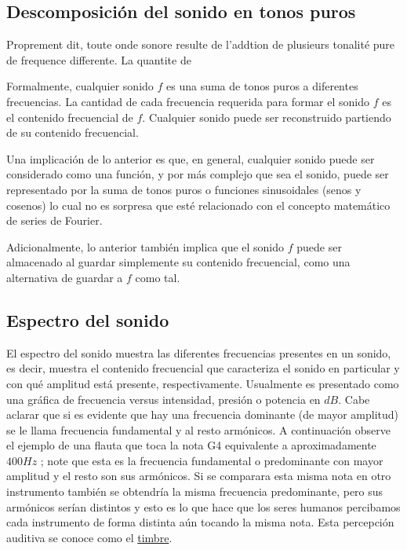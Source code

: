 \documentclass[conference,onecolumn]{IEEEtran}
\begin{document}
\subsection{Descomposición del sonido en tonos puros}
Proprement dit, toute onde sonore resulte de l’addtion de plusieurs tonalité pure de frequence differente. La quantite de 

Formalmente, cualquier sonido $f$ es una suma de tonos puros a diferentes frecuencias. La cantidad de cada frecuencia requerida para formar el sonido $f$ es el contenido frecuencial de $f$. Cualquier sonido puede ser reconstruido partiendo de su contenido frecuencial.

Una implicación de lo anterior es que, en general, cualquier sonido puede ser considerado como una función, y por más complejo que sea el sonido, puede ser representado por la suma de tonos puros o funciones sinusoidales (senos y cosenos) lo cual no es sorpresa que esté relacionado con el concepto matemático de series de Fourier. 

Adicionalmente, lo anterior también implica que el sonido $f$ puede ser almacenado al guardar simplemente su contenido frecuencial, como una alternativa de guardar a $f$ como tal.

\subsection{Espectro del sonido}
El espectro del sonido muestra las diferentes frecuencias presentes en un sonido, es decir, muestra el contenido frecuencial que caracteriza el sonido en particular y con qué amplitud está presente, respectivamente. Usualmente es presentado como una gráfica de frecuencia versus intensidad, presión o potencia en $dB$. Cabe aclarar que si es evidente que hay una frecuencia dominante (de mayor amplitud) se le llama frecuencia fundamental y al resto armónicos. A continuación observe el ejemplo de una flauta que toca la nota G4 equivalente a aproximadamente $400 Hz$ ; note que esta es la frecuencia fundamental o predominante con mayor amplitud y el resto son sus armónicos. Si se comparara esta misma nota en otro instrumento también se obtendría la misma frecuencia predominante, pero sus armónicos serían distintos y esto es lo que hace que los seres humanos percibamos cada instrumento de forma distinta aún tocando la misma nota. Esta percepción auditiva se conoce como el \underline{timbre}.
\end{document}
